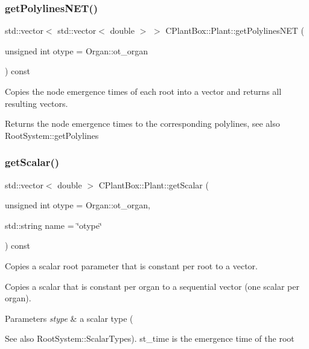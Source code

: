 \subsubsection{\texorpdfstring{get\+Polylines\+N\+E\+T()}{getPolylinesNET()}}
{\footnotesize\ttfamily std\+::vector$<$ std\+::vector$<$ double $>$ $>$ C\+Plant\+Box\+::\+Plant\+::get\+Polylines\+N\+ET (\begin{DoxyParamCaption}\item[{unsigned int}]{otype = {\ttfamily Organ\+:\+:ot\+\_\+organ} }\end{DoxyParamCaption}) const}



Copies the node emergence times of each root into a vector and returns all resulting vectors. 

Returns the node emergence times to the corresponding polylines, see also Root\+System\+::get\+Polylines \mbox{\label{classCPlantBox_1_1Plant_ad320a4832b6fa51020b0e9b9e7d033bb}} 
\subsubsection{\texorpdfstring{get\+Scalar()}{getScalar()}}
{\footnotesize\ttfamily std\+::vector$<$ double $>$ C\+Plant\+Box\+::\+Plant\+::get\+Scalar (\begin{DoxyParamCaption}\item[{unsigned int}]{otype = {\ttfamily Organ\+:\+:ot\+\_\+organ},  }\item[{std\+::string}]{name = {\ttfamily \char`\"{}otype\char`\"{}} }\end{DoxyParamCaption}) const}



Copies a scalar root parameter that is constant per root to a vector. 

Copies a scalar that is constant per organ to a sequential vector (one scalar per organ).


\begin{DoxyParams}{Parameters}
{\em stype} & a scalar type (\\
\hline
\end{DoxyParams}
\begin{DoxySeeAlso}{See also}
Root\+System\+::\+Scalar\+Types). st\+\_\+time is the emergence time of the root 
\end{DoxySeeAlso}
\mbox{\label{classCPlantBox_1_1Plant_a3037d23bc42fda923c23338e5d52f76e}} 
